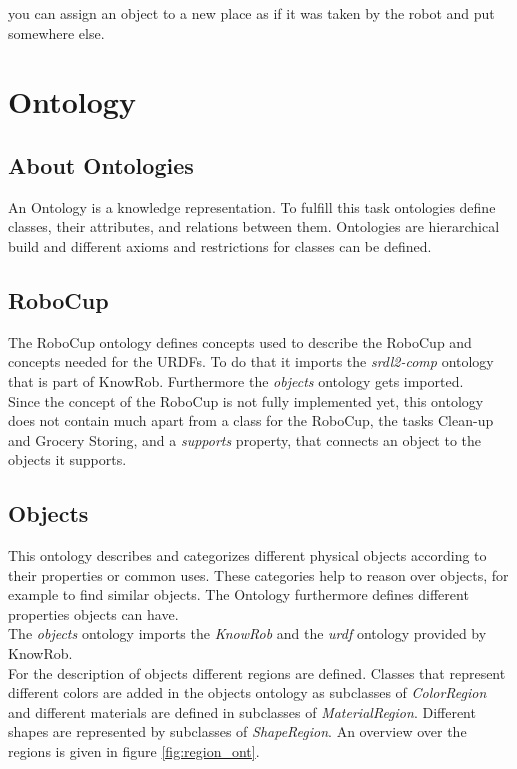 \documentclass[main.tex]{subfiles}
\begin{document}
you can assign an object to a new place as if it was taken by the robot and put somewhere else.

\section{Ontology}
\subsection{About Ontologies}
An Ontology is a knowledge representation. To fulfill this task ontologies define classes, their attributes, and relations between them. Ontologies are hierarchical build and different axioms and restrictions for classes can be defined.


\subsection{RoboCup}
The RoboCup ontology defines concepts used to describe the RoboCup and concepts needed for the URDFs. To do that it imports the \textit{srdl2-comp} ontology that is part of KnowRob. Furthermore the \textit{objects} ontology gets imported.\\
Since the concept of the RoboCup is not fully implemented yet, this ontology does not contain much apart from a class for the RoboCup, the tasks Clean-up and Grocery Storing, and a \textit{supports} property, that connects an object to the objects it supports.

\subsection{Objects}

This ontology describes and categorizes different physical objects according to their properties or common uses. These categories help to reason over objects, for example to find similar objects. The Ontology furthermore defines different properties objects can have. \\
The \textit{objects} ontology imports the \textit{KnowRob} and the \textit{urdf} ontology provided by KnowRob.\\
For the description of objects different regions are defined. Classes that represent different colors are added in the objects ontology as subclasses of \textit{ColorRegion} and different materials are defined in subclasses of \textit{MaterialRegion}. Different shapes are represented by subclasses of \textit{ShapeRegion}. An overview over the regions is given in figure \ref{fig:region_ont}.
\end{document}
